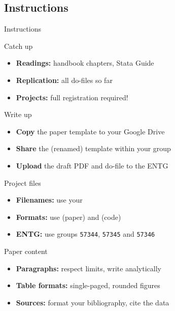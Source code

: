 \documentclass[t]{beamer}
\begin{document}
	\subsection{Instructions}
	
	\begin{frame}[t]{Instructions}
		
		\begin{block}{Catch up}
			\begin{itemize}
				\item \textbf{Readings:} handbook chapters, Stata Guide
				\item \textbf{Replication:} all do-files so far
				\item \textbf{Projects:} full registration required!
			\end{itemize}
		\end{block}

		\begin{block}{Write up}
			\begin{itemize}
				\item \textbf{Copy} the paper template to your Google Drive
				\item \textbf{Share} the (renamed) template within your group
				\item \textbf{Upload} the draft PDF and do-file to the ENTG
			\end{itemize}
		\end{block}
		
	\end{frame}

	\begin{frame}[t]{}
		
		\begin{alertblock}{Project files}
			\begin{itemize}
				\item \textbf{Filenames:} use your 
				\item \textbf{Formats:} use  (paper) and  (code)
				\item \textbf{ENTG:} use groups %
					\texttt{57344}, \texttt{57345} and \texttt{57346}
			\end{itemize}
		\end{alertblock}

		\begin{alertblock}{Paper content}
			\begin{itemize}
				\item \textbf{Paragraphs:} respect limits, write analytically 
				\item \textbf{Table formats:} single-paged, rounded figures
				\item \textbf{Sources:} format your bibliography, cite the data
			\end{itemize}
		\end{alertblock}
		
	\end{frame}
\end{document}
